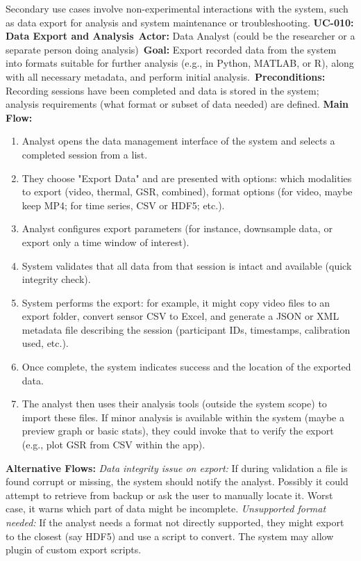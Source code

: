 \documentclass[11pt,a4paper]{report}
\begin{document}
Secondary use cases involve non-experimental interactions with the system, such as data export for analysis and system maintenance or troubleshooting. \noindent\textbf{UC-010: Data Export and Analysis}\
\textbf{Actor:} Data Analyst (could be the researcher or a separate person doing analysis)\
\textbf{Goal:} Export recorded data from the system into formats suitable for further analysis (e.g., in Python, MATLAB, or R), along with all necessary metadata, and perform initial analysis.\
\textbf{Preconditions:} Recording sessions have been completed and data is stored in the system; analysis requirements (what format or subset of data needed) are defined. \textbf{Main Flow:}
\begin{enumerate}
\item Analyst opens the data management interface of the system and selects a completed session from a list.
\item They choose "Export Data" and are presented with options: which modalities to export (video, thermal, GSR, combined), format options (for video, maybe keep MP4; for time series, CSV or HDF5; etc.).
\item Analyst configures export parameters (for instance, downsample data, or export only a time window of interest).
\item System validates that all data from that session is intact and available (quick integrity check).
\item System performs the export: for example, it might copy video files to an export folder, convert sensor CSV to Excel, and generate a JSON or XML metadata file describing the session (participant IDs, timestamps, calibration used, etc.).
\item Once complete, the system indicates success and the location of the exported data.
\item The analyst then uses their analysis tools (outside the system scope) to import these files. If minor analysis is available within the system (maybe a preview graph or basic stats), they could invoke that to verify the export (e.g., plot GSR from CSV within the app).
\end{enumerate} \textbf{Alternative Flows:}
\textit{Data integrity issue on export:} If during validation a file is found corrupt or missing, the system should notify the analyst. Possibly it could attempt to retrieve from backup or ask the user to manually locate it. Worst case, it warns which part of data might be incomplete.
\textit{Unsupported format needed:} If the analyst needs a format not directly supported, they might export to the closest (say HDF5) and use a script to convert. The system may allow plugin of custom export scripts.
\end{document}
